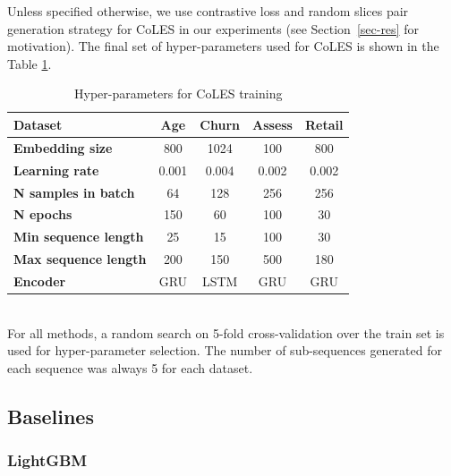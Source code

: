 \documentclass[sigconf, anonymous]{acmart}
\begin{document}
Unless specified otherwise, we use contrastive loss and random slices pair generation strategy
for CoLES in our experiments (see Section~\ref{sec-res} for motivation). The final set of
hyper-parameters used for CoLES is shown in the Table \ref{tab-hyper}.

\begin{table}
    \centering
    \caption{Hyper-parameters for CoLES training}
    \begin{tabularx}{\linewidth}{Xcccc}
        \toprule
            \textbf{Dataset} & \textbf{Age} & \textbf{Churn} & \textbf{Assess} & \textbf{Retail} \\
        \midrule
            \textbf{Embedding size} & 800 & 1024 & 100 & 800 \\
            \textbf{Learning rate} & 0.001 & 0.004 & 0.002 & 0.002 \\
            \textbf{N samples in batch} & 64 & 128 & 256 & 256 \\
            \textbf{N epochs} & 150 & 60 & 100 & 30 \\
            \textbf{Min sequence length} & 25 & 15 & 100 & 30 \\
            \textbf{Max sequence length} & 200 & 150 & 500 & 180 \\
            \textbf{Encoder} & GRU & LSTM & GRU & GRU \\
        \bottomrule
    \end{tabularx}%
    \\
    \small{
        For all methods, a random search on 5-fold cross-validation over the train set is
        used for hyper-parameter selection. The number of sub-sequences generated for each
        sequence was always 5 for each dataset.
    }
    \label{tab-hyper}
\end{table}

\subsection{Baselines} \label{sec-baselines}


\subsubsection{LightGBM}
\end{document}
